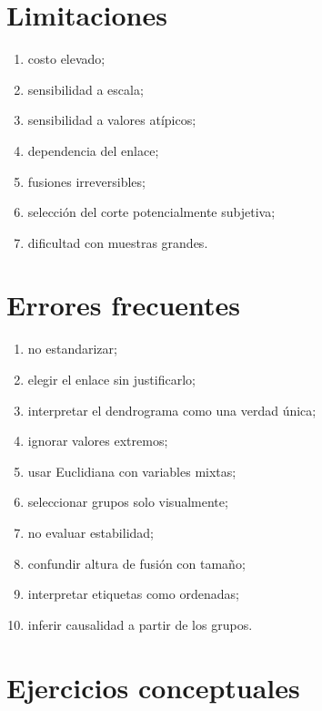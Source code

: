 \documentclass[
  spanish,
  10.5pt,
  letterpaper,
  DIV=11,
  numbers=noendperiod,
  oneside,
  open=any]{scrreprt}
\providecommand{\tightlist}{%
  \setlength{\itemsep}{0pt}\setlength{\parskip}{0pt}}
\theoremstyle{definition}
\theoremstyle{definition}
\theoremstyle{plain}
\theoremstyle{remark}
\begin{document}
\section*{Limitaciones}\label{limitaciones-6}


\begin{enumerate}
\def\labelenumi{\arabic{enumi}.}
\tightlist
\item
  costo elevado;
\item
  sensibilidad a escala;
\item
  sensibilidad a valores atípicos;
\item
  dependencia del enlace;
\item
  fusiones irreversibles;
\item
  selección del corte potencialmente subjetiva;
\item
  dificultad con muestras grandes.
\end{enumerate}

\section*{Errores frecuentes}\label{errores-frecuentes-17}


\begin{enumerate}
\def\labelenumi{\arabic{enumi}.}
\tightlist
\item
  no estandarizar;
\item
  elegir el enlace sin justificarlo;
\item
  interpretar el dendrograma como una verdad única;
\item
  ignorar valores extremos;
\item
  usar Euclidiana con variables mixtas;
\item
  seleccionar grupos solo visualmente;
\item
  no evaluar estabilidad;
\item
  confundir altura de fusión con tamaño;
\item
  interpretar etiquetas como ordenadas;
\item
  inferir causalidad a partir de los grupos.
\end{enumerate}

\section*{Ejercicios conceptuales}\label{ejercicios-conceptuales-17}
\end{document}

